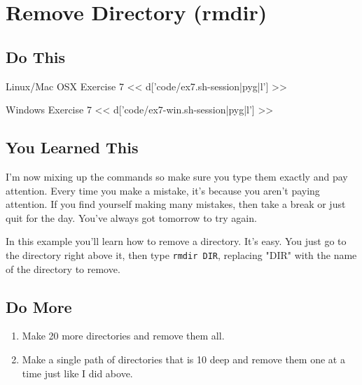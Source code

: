 \chapter{Remove Directory (rmdir)}

\section{Do This}

\begin{code}{Linux/Mac OSX Exercise 7}
<< d['code/ex7.sh-session|pyg|l'] >>
\end{code}

\begin{code}{Windows Exercise 7}
<< d['code/ex7-win.sh-session|pyg|l'] >>
\end{code}

\section{You Learned This}

I'm now mixing up the commands so make sure you type them exactly and pay attention.
Every time you make a mistake, it's because you aren't paying attention.  If you
find yourself making many mistakes, then take a break or just quit for the day.
You've always got tomorrow to try again.

In this example you'll learn how to remove a directory.  It's easy. You just
go to the directory right above it, then type \verb|rmdir DIR|, replacing "DIR"
with the name of the directory to remove.

\section{Do More}

\begin{enumerate}
\item Make 20 more directories and remove them all.
\item Make a single path of directories that is 10 deep and remove them one at a
    time just like I did above.
\end{enumerate}


